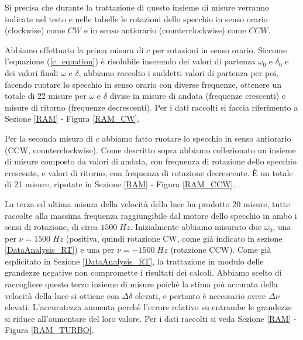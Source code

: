 \documentclass{article}
\begin{document}
\vspace{3mm}

Si precisa che durante la trattazione di questo insieme di misure verranno indicate nel testo e nelle tabelle le rotazioni dello specchio in senso orario (clockwise) come 
$CW$ e in senso antiorario (counterclockwise) come $CCW$.

\vspace{3mm}

Abbiamo effettuato la prima misura di $c$ per rotazioni in senso orario.
Siccome l'equazione (\ref{c_equation}) è risolubile inserendo dei valori di partenza $\omega_0$ e $\delta_0$ e dei valori finali $\omega$ e $\delta$, abbiamo raccolto
i suddetti valori di partenza per poi, facendo ruotare lo specchio in senso orario con diverse frequenze, ottenere un totale di 22 misure per $\omega$ e $\delta$ divise
in misure di andata (frequenze crescenti) e misure di ritorno (frequenze decrescenti). Per i dati raccolti si faccia riferimento a Sezione \ref{RAM} - Figura \ref{RAM_CW}.

\vspace{3mm}

Per la seconda misura di $c$ abbiamo fatto ruotare lo specchio in senso antiorario (CCW, counterclockwise). Come descritto sopra abbiamo collezionato un insieme di
misure composto da valori di andata, con frequenza di rotazione dello specchio crescente, e valori di ritorno, con frequenza di rotazione decrescente. È un 
totale di 21 misure, ripotate in Sezione \ref{RAM} - Figura \ref{RAM_CCW}.

\vspace{3mm}

La terza ed ultima misura della velocità della luce ha prodotto 20 misure, tutte raccolte alla massima frequenza raggiungibile dal motore dello specchio in ambo i sensi di
rotazione, di circa $1500 \; Hz$.
Inizialmente abbiamo misurato due $\omega_0$, una per $\nu=1500 \; Hz$ (positiva, quindi rotazione CW, come già indicato in sezione \ref{DataAnalysis_RT}) e una per $\nu=-1500 \; Hz$ (rotazione CCW). Come già esplicitato in Sezione \ref{DataAnalysis_RT}, la trattazione in modulo delle grandezze negative non compromette i risultati dei calcoli. 
Abbiamo scelto di raccogliere questo terzo insieme di misure poichè la stima più accurata della velocità della luce si ottiene con $\Delta\delta$ elevati, e pertanto è 
necessario avere $\Delta\nu$ elevati. L'accuratezza aumenta perchè l'errore relativo su entrambe le grandezze si riduce all'aumentare del loro valore.
Per i dati raccolti si veda Sezione \ref{RAM} - Figura \ref{RAM_TURBO}.
\end{document}
